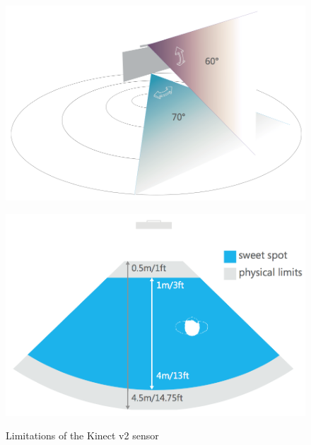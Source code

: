 \begin{figure}[htb]
	\centering
	\begin{minipage}[t]{0.44\linewidth}
		\centering
		\includegraphics[width=1\linewidth]{Pictures/5_1_1_visionAngle}
		\label{fig:5_1_1_visionAngle}
	\end{minipage}
	\hfill
	\begin{minipage}[t]{0.44\linewidth}
		\centering
		\includegraphics[width=1\linewidth]{Pictures/5_1_1_trackingRange}
		\label{fig:5_1_1_trackingRange}
	\end{minipage}
	\caption{Limitations of the Kinect v2 sensor~\cite{MicrosoftHIG2014-mh}}
	\label{fig:5_1_1_sensorConstraints}
\end{figure}


